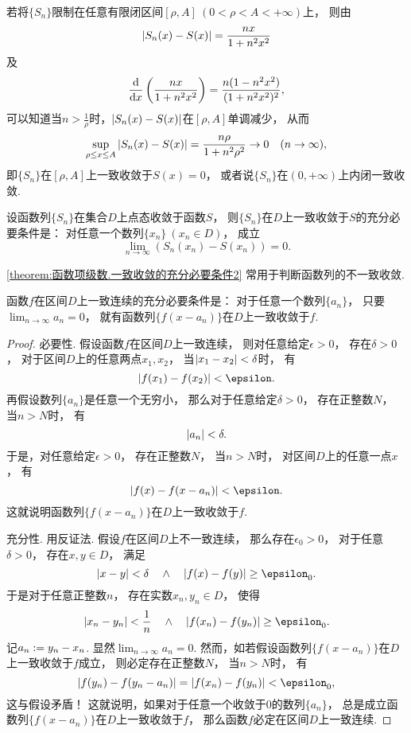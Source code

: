 \begin{example}
若将\(\{S_n\}\)限制在任意有限闭区间\([\rho,A]\ (0<\rho<A<+\infty)\)上，
则由\[
	\abs{S_n(x) - S(x)} = \frac{nx}{1+n^2x^2}
\]及\[
	\dv{x} \left(\frac{nx}{1+n^2x^2}\right)
	= \frac{n(1-n^2x^2)}{(1+n^2x^2)^2},
\]
可以知道当\(n>\frac1\rho\)时，\(\abs{S_n(x) - S(x)}\)在\([\rho,A]\)单调减少，
从而\[
	\sup_{\rho \leq x \leq A} \abs{S_n(x) - S(x)}
	= \frac{n\rho}{1+n^2\rho^2}
	\to 0
	\quad(n\to\infty),
\]
即\(\{S_n\}\)在\([\rho,A]\)上一致收敛于\(S(x)=0\)，
或者说\(\{S_n\}\)在\((0,+\infty)\)上内闭一致收敛.
\end{example}

\begin{theorem}\label{theorem:函数项级数.一致收敛的充分必要条件2}
设函数列\(\{S_n\}\)在集合\(D\)上点态收敛于函数\(S\)，
则\(\{S_n\}\)在\(D\)上一致收敛于\(S\)的充分必要条件是：
对任意一个数列\(\{x_n\}\ (x_n \in D)\)，
成立\[
	\lim_{n\to\infty} (S_n(x_n) - S(x_n)) = 0.
\]
\end{theorem}
\cref{theorem:函数项级数.一致收敛的充分必要条件2}
常用于判断函数列的不一致收敛.

\begin{example}
函数\(f\)在区间\(D\)上一致连续的充分必要条件是：
对于任意一个数列\(\{a_n\}\)，
只要\(\lim_{n\to\infty} a_n = 0\)，
就有函数列\(\{f(x-a_n)\}\)在\(D\)上一致收敛于\(f\).
\begin{proof}
必要性.
假设函数\(f\)在区间\(D\)上一致连续，
则对任意给定\(\epsilon>0\)，
存在\(\delta>0\)，
对于区间\(D\)上的任意两点\(x_1,x_2\)，
当\(\abs{x_1-x_2}<\delta\)时，
有\[
	\abs{f(x_1)-f(x_2)}<\epsilon.
\]
再假设数列\(\{a_n\}\)是任意一个无穷小，
那么对于任意给定\(\delta>0\)，
存在正整数\(N\)，
当\(n>N\)时，
有\[
	\abs{a_n} < \delta.
\]
于是，对任意给定\(\epsilon>0\)，
存在正整数\(N\)，
当\(n>N\)时，
对区间\(D\)上的任意一点\(x\)，
有\[
	\abs{f(x)-f(x-a_n)}<\epsilon.
\]
这就说明函数列\(\{f(x-a_n)\}\)在\(D\)上一致收敛于\(f\).

充分性.
用反证法.
假设\(f\)在区间\(D\)上不一致连续，
那么存在\(\epsilon_0>0\)，
对于任意\(\delta>0\)，
存在\(x,y \in D\)，
满足\[
	\abs{x-y}<\delta
	\quad\land\quad
	\abs{f(x)-f(y)}\geq\epsilon_0.
\]
于是对于任意正整数\(n\)，
存在实数\(x_n,y_n \in D\)，
使得\[
	\abs{x_n-y_n}<\frac1n
	\quad\land\quad
	\abs{f(x_n)-f(y_n)}\geq\epsilon_0.
\]
记\(a_n := y_n - x_n\).
显然\(\lim_{n\to\infty} a_n = 0\).
然而，如若假设函数列\(\{f(x-a_n)\}\)在\(D\)上一致收敛于\(f\)成立，
则必定存在正整数\(N\)，
当\(n>N\)时，
有\[
	\abs{f(y_n)-f(y_n-a_n)}
	=\abs{f(x_n)-f(y_n)}
	<\epsilon_0,
\]
这与假设矛盾！
这就说明，如果对于任意一个收敛于\(0\)的数列\(\{a_n\}\)，
总是成立函数列\(\{f(x-a_n)\}\)在\(D\)上一致收敛于\(f\)，
那么函数\(f\)必定在区间\(D\)上一致连续.
\end{proof}
\end{example}
